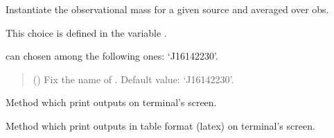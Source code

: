 \documentclass[letterpaper,10pt,english]{sphinxmanual}
\begin{document}

\begin{fulllineitems}
\label{\detokenize{source/api/setup_astro_masses:nucleardatapy.astro.setup_masses.setupMassesAverage}}
\pysigstartsignatures
{}
\pysigstopsignatures
\sphinxAtStartPar
Instantiate the observational mass for a given source and averaged over obs.

\sphinxAtStartPar
This choice is defined in the variable .

\sphinxAtStartPar
{} can chosen among the following ones: ‘J1614\textendash{}2230’.
\begin{quote}\begin{description}
\sphinxAtStartPar
{} (\sphinxstyleliteralemphasis{\sphinxupquote{, }}) \textendash{} Fix the name of . Default value: ‘J1614\textendash{}2230’.

\end{description}\end{quote}

\sphinxAtStartPar
{}

\begin{fulllineitems}
\label{\detokenize{source/api/setup_astro_masses:nucleardatapy.astro.setup_masses.setupMassesAverage.print_output}}
\pysigstartsignatures
{}
\pysigstopsignatures
\sphinxAtStartPar
Method which print outputs on terminal’s screen.

\end{fulllineitems}


\begin{fulllineitems}
\label{\detokenize{source/api/setup_astro_masses:nucleardatapy.astro.setup_masses.setupMassesAverage.print_table}}
\pysigstartsignatures
{}
\pysigstopsignatures
\sphinxAtStartPar
Method which print outputs in table format (latex) on terminal’s screen.

\end{fulllineitems}


\end{fulllineitems}
\end{document}
